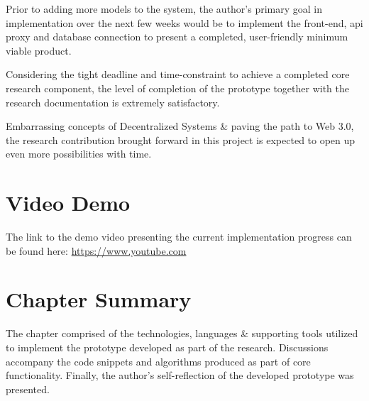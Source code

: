 Prior to adding more models to the system, the author's primary goal in implementation over the next few weeks would be to implement the front-end, \gls{api} proxy and database connection to present a completed, user-friendly minimum viable product.

Considering the tight deadline and time-constraint to achieve a completed core research component, the level of completion of the prototype together with the research documentation is extremely satisfactory.

Embarrassing concepts of Decentralized Systems \& paving the path to Web 3.0, the research contribution brought forward in this project is expected to open up even more possibilities with time.

\section{Video Demo}
The link to the demo video presenting the current implementation progress can be found here: \url{https://www.youtube.com}

\section{Chapter Summary}
The chapter comprised of the technologies, languages \& supporting tools utilized to implement the prototype developed as part of the research. Discussions accompany the code snippets and algorithms produced as part of core functionality. Finally, the author's self-reflection of the developed prototype was presented.
